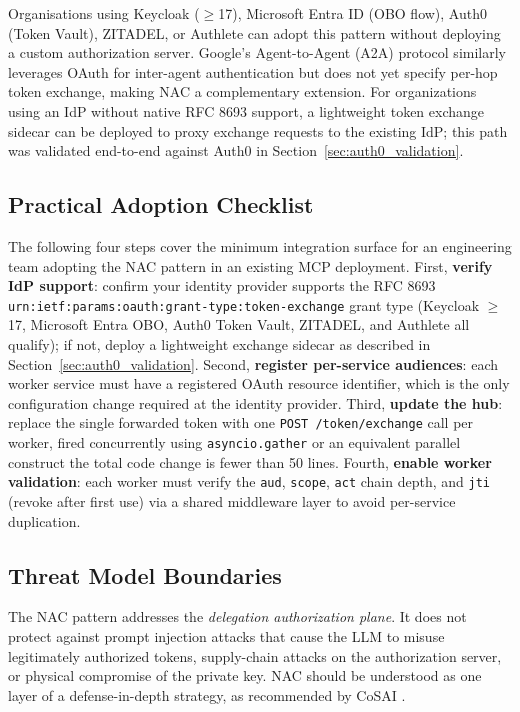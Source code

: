 \documentclass[journal]{IEEEtran}
\begin{document}
Organisations using Keycloak ($\geq$17), Microsoft Entra ID (OBO flow), Auth0
(Token Vault), ZITADEL, or Authlete can adopt this pattern without deploying a
custom authorization server. Google's Agent-to-Agent (A2A) protocol
\cite{google_a2a} similarly leverages OAuth for inter-agent authentication but
does not yet specify per-hop token exchange, making NAC a complementary
extension. For organizations using an IdP without native RFC 8693 support, a
lightweight token exchange sidecar can be deployed to proxy exchange requests
to the existing IdP; this path was validated end-to-end against Auth0 in
Section~\ref{sec:auth0_validation}.

\subsection{Practical Adoption Checklist}

The following four steps cover the minimum integration surface for an engineering
team adopting the NAC pattern in an existing MCP deployment. First,
\textbf{verify IdP support}: confirm your identity provider supports the RFC 8693
\texttt{urn:ietf:params:oauth:grant-type:token-exchange} grant type (Keycloak
$\geq$17, Microsoft Entra OBO, Auth0 Token Vault, ZITADEL, and Authlete all
qualify); if not, deploy a lightweight exchange sidecar as described in
Section~\ref{sec:auth0_validation}. Second, \textbf{register per-service
audiences}: each worker service must have a registered OAuth resource identifier,
which is the only configuration change required at the identity provider. Third,
\textbf{update the hub}: replace the single forwarded token with one
\texttt{POST /token/exchange} call per worker, fired concurrently using
\texttt{asyncio.gather} or an equivalent parallel construct the total code
change is fewer than 50 lines. Fourth, \textbf{enable worker validation}: each
worker must verify the \texttt{aud}, \texttt{scope}, \texttt{act} chain depth,
and \texttt{jti} (revoke after first use) via a shared middleware layer to
avoid per-service duplication.

\subsection{Threat Model Boundaries}

The NAC pattern addresses the \textit{delegation authorization plane}. It does
not protect against prompt injection attacks that cause the LLM to misuse
legitimately authorized tokens, supply-chain attacks on the authorization server,
or physical compromise of the private key. NAC should be understood as one layer
of a defense-in-depth strategy, as recommended by CoSAI \cite{cosai_mcp}.
\end{document}
